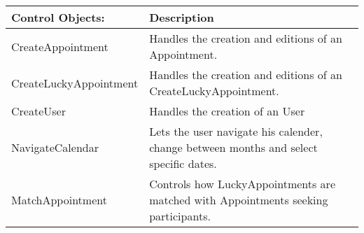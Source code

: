 {\tabulinesep=1.2mm
\begin{tabu}{ | p{6cm} | p{10cm} |}
    \hline
    Control Objects: 		& 		Description    \\ \hline
    CreateAppointment       &       Handles the creation and editions of an Appointment.\\\hline
    CreateLuckyAppointment  &       Handles the creation and editions of an CreateLuckyAppointment.\\\hline
    CreateUser              &       Handles the creation of an User\\\hline
    NavigateCalendar        &       Lets the user navigate his calender, change between months and select specific dates.\\\hline
    MatchAppointment 	    & 		Controls how LuckyAppointments are matched with Appointments seeking participants.\\\hline
\end{tabu}
}

